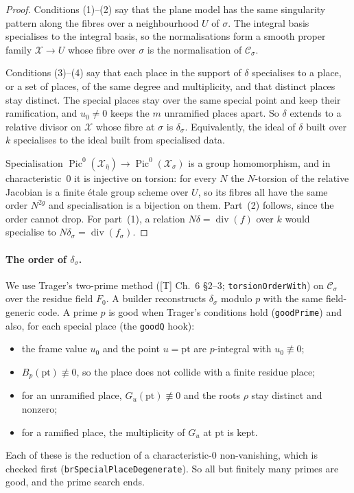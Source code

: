 \documentclass[11pt]{article}
\theoremstyle{definition}
\theoremstyle{remark}
\newcommand{\code}[1]{\texttt{#1}}
\begin{document}
\begin{proof}
Conditions (1)--(2) say that the plane model has the same singularity pattern
along the fibres over a neighbourhood $U$ of $\sigma$. The integral basis
specialises to the integral basis, so the normalisations form a smooth proper
family $\mathcal X\to U$ whose fibre over $\sigma$ is the normalisation of
$\mathcal C_\sigma$.

Conditions (3)--(4) say that each place in the support of $\delta$ specialises
to a place, or a set of places, of the same degree and multiplicity, and that
distinct places stay distinct. The special places stay over the same special
point and keep their ramification, and $u_0\neq0$ keeps the $m$ unramified
places apart. So $\delta$ extends to a relative divisor on $\mathcal X$ whose
fibre at $\sigma$ is $\delta_\sigma$. Equivalently, the ideal of $\delta$ built
over $k$ specialises to the ideal built from specialised data.

Specialisation $\operatorname{Pic}^0(\mathcal X_{\bar\eta})\to\operatorname{Pic}^0(\mathcal X_\sigma)$
is a group homomorphism, and in characteristic~0 it is injective on torsion:
for every $N$ the $N$-torsion of the relative Jacobian is a finite étale group
scheme over $U$, so its fibres all have the same order $N^{2g}$ and
specialisation is a bijection on them. Part~(2) follows, since the order
cannot drop. For part~(1), a relation $N\delta=\operatorname{div}(f)$ over
$k$ would specialise to $N\delta_\sigma=\operatorname{div}(f_\sigma)$.
\end{proof}

\paragraph{The order of $\delta_\sigma$.} We use Trager's two-prime method
([T] Ch.~6 \S2--3; \code{torsionOrderWith}) on $\mathcal C_\sigma$ over the
residue field $F_0$. A builder reconstructs $\delta_\sigma$ modulo $p$ with the
same field-generic code. A prime $p$ is good when Trager's conditions hold
(\code{goodPrime}) and also, for each special place (the \code{goodQ} hook):
\begin{itemize}
\item the frame value $u_0$ and the point $u=\mathrm{pt}$ are $p$-integral with
  $u_0\not\equiv0$;
\item $B_p(\mathrm{pt})\not\equiv0$, so the place does not collide with a finite
  residue place;
\item for an unramified place, $G_u(\mathrm{pt})\not\equiv0$ and the roots $\rho$
  stay distinct and nonzero;
\item for a ramified place, the multiplicity of $G_u$ at $\mathrm{pt}$ is kept.
\end{itemize}
Each of these is the reduction of a characteristic-0 non-vanishing, which is
checked first (\code{brSpecialPlaceDegenerate}). So all but finitely many primes
are good, and the prime search ends.
\end{document}

